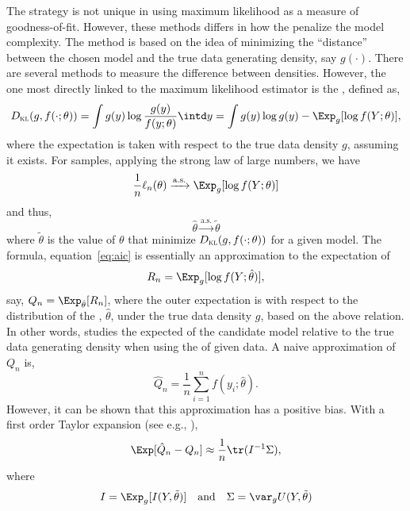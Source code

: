 The \aic strategy is not unique in using maximum likelihood as a measure of
goodness-of-fit. However, these methods differs in how the penalize the model
complexity. The \aic method is based on the idea of minimizing the
``distance'' between the chosen model and the true data generating density,
say $g(\cdot)$. There are several methods to measure the difference between
densities. However, the one most directly linked to the maximum likelihood
estimator is the \kl, defined as,
\begin{equation}
  D_{\text{\textsc{kl}}}(g, f(\cdot;\theta))
  = \int g(y)\log\frac{g(y)}{f(y;\theta)}\intd y
  = \int g(y)\log g(y) - \Exp_g[\log f(Y;\theta)],
  \label{eq:kl}
\end{equation}
where the expectation is taken with respect to the true data density $g$,
assuming it exists. For \iid samples, applying the strong law of large
numbers, we have
\begin{equation}
  \frac{1}{n}\ell_n(\theta) \xrightarrow{\text{a.s.}}
  \Exp_g[\log f(Y;\theta)]
\end{equation}
and thus,
\begin{equation}
  \hat\theta \xrightarrow{\text{a.s.}} \tilde\theta
\end{equation}
where $\tilde\theta$ is the value of $\theta$ that minimize
$D_{\text{\textsc{kl}}}(g,f(\cdot;\theta))$ for a given model. The \aic
formula, equation~\eqref{eq:aic} is essentially an approximation to the
expectation of
\begin{equation}
  R_n = \Exp_g[\log f(Y;\hat\theta)],
\end{equation}
say, $Q_n = \Exp_{\hat\theta}[R_n]$, where the outer expectation is with
respect to the distribution of the \mle, $\hat\theta$, under the true data
density $g$, based on the above relation. In other words, \aic studies the
expected \kl of the candidate model relative to the true data generating
density when using the \mle of given data. A naive approximation of $Q_n$ is,
\begin{equation}
  \hat{Q}_n = \frac{1}{n} \sum_{i=1}^nf(y_i;\hat\theta).
\end{equation}
However, it can be shown that this approximation has a positive bias. With a
first order Taylor expansion (see e.g., \cite[][sec.~2.3]{Claeskens:2008tq}),
\begin{equation}
  \Exp[\hat{Q}_n - Q_n] \approx \frac{1}{n}\tr(I^{-1}\Sigma),
  \label{eq:aic Taylor}
\end{equation}
where
\begin{equation}
  I = \Exp_g[I(Y,\tilde\theta)]\quad\text{and}\quad
  \Sigma = \var_g U(Y,\tilde\theta)
  \label{eq:aic bias}
\end{equation}
